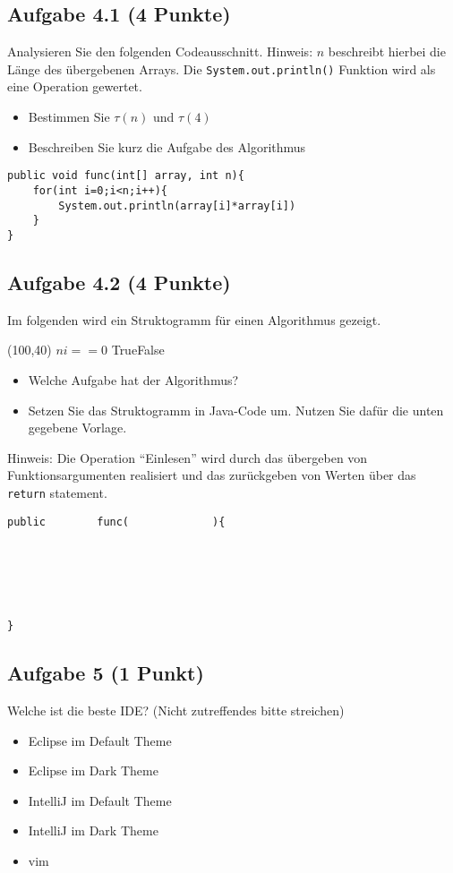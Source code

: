 \documentclass[a4paper,
			   fontsize=12pt]{article}
\begin{document}
\newpage
\subsection*{Aufgabe 4.1 (4 Punkte)}
Analysieren Sie den folgenden Codeausschnitt. Hinweis: $n$ beschreibt hierbei die Länge des übergebenen Arrays. Die \texttt{System.out.println()} Funktion wird als eine Operation gewertet.
\begin{itemize}
	\item Bestimmen Sie $\tau(n)$ und $\tau(4)$
	\item Beschreiben Sie kurz die Aufgabe des Algorithmus
\end{itemize}

\begin{lstlisting}
public void func(int[] array, int n){
	for(int i=0;i<n;i++){
		System.out.println(array[i]*array[i])
	}
}
\end{lstlisting}

\vspace{5cm}
\subsection*{Aufgabe 4.2 (4 Punkte)}
Im folgenden wird ein Struktogramm für einen Algorithmus gezeigt.
\begin{centernss}
    \begin{struktogramm}(100,40)
            { \( n i==0 \) }{True}{False}
            \change
            \ifend
        \whileend
    \end{struktogramm}
\end{centernss}

\begin{itemize}
	\item Welche Aufgabe hat der Algorithmus?
	\item Setzen Sie das Struktogramm in Java-Code um. Nutzen Sie dafür die unten gegebene Vorlage.
\end{itemize}

\vspace{2,5cm}

Hinweis: Die Operation "`Einlesen"' wird durch das übergeben von Funktionsargumenten realisiert und das zurückgeben von Werten über das \texttt{return} statement.

\begin{lstlisting}
public        func(             ){






}
\end{lstlisting}

\subsection*{Aufgabe 5 (1 Punkt)}
Welche ist die beste IDE? (Nicht zutreffendes bitte streichen)
\begin{itemize}
	\item Eclipse im Default Theme
	\item Eclipse im Dark Theme
	\item IntelliJ im Default Theme
	\item IntelliJ im Dark Theme
	\item vim
\end{itemize}
\end{document}
